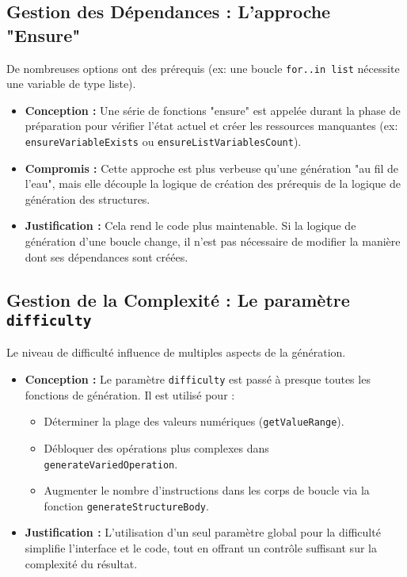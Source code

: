 \documentclass[a4paper, 11pt]{article}
\begin{document}
\subsection{Gestion des Dépendances : L'approche "Ensure"}
De nombreuses options ont des prérequis (ex: une boucle \texttt{for..in list} nécessite une variable de type liste).
\begin{itemize}
    \item \textbf{Conception :} Une série de fonctions "ensure" est appelée durant la phase de préparation pour vérifier l'état actuel et créer les ressources manquantes (ex: \texttt{ensureVariableExists} ou \texttt{ensureListVariablesCount}).
    \item \textbf{Compromis :} Cette approche est plus verbeuse qu'une génération "au fil de l'eau", mais elle découple la logique de création des prérequis de la logique de génération des structures.
    \item \textbf{Justification :} Cela rend le code plus maintenable. Si la logique de génération d'une boucle change, il n'est pas nécessaire de modifier la manière dont ses dépendances sont créées.
\end{itemize}

\subsection{Gestion de la Complexité : Le paramètre \texttt{difficulty}}
Le niveau de difficulté influence de multiples aspects de la génération.
\begin{itemize}
    \item \textbf{Conception :} Le paramètre \texttt{difficulty} est passé à presque toutes les fonctions de génération. Il est utilisé pour :
        \begin{itemize}
            \item Déterminer la plage des valeurs numériques (\texttt{getValueRange}).
            \item Débloquer des opérations plus complexes dans \texttt{generateVariedOperation}.
            \item Augmenter le nombre d'instructions dans les corps de boucle via la fonction \texttt{generateStructureBody}.
        \end{itemize}
    \item \textbf{Justification :} L'utilisation d'un seul paramètre global pour la difficulté simplifie l'interface et le code, tout en offrant un contrôle suffisant sur la complexité du résultat.
\end{itemize}
\end{document}
